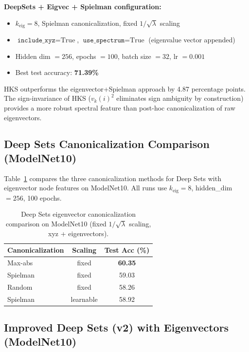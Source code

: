 \documentclass[11pt]{article}
\begin{document}
\noindent\textbf{DeepSets + Eigvec + Spielman configuration:}
\begin{itemize}[nosep]
    \item $k_{\text{eig}} = 8$, Spielman canonicalization, fixed $1/\sqrt{\lambda}$ scaling
    \item $\texttt{include\_xyz} = \text{True}$, $\texttt{use\_spectrum} = \text{True}$ (eigenvalue vector appended)
    \item Hidden dim $= 256$, epochs $= 100$, batch size $= 32$, lr $= 0.001$
    \item Best test accuracy: \textbf{71.39\%}
\end{itemize}

HKS outperforms the eigenvector+Spielman approach by 4.87 percentage points. The
sign-invariance of HKS ($v_k(i)^2$ eliminates sign ambiguity by construction) provides a
more robust spectral feature than post-hoc canonicalization of raw eigenvectors.

\subsection{Deep Sets Canonicalization Comparison (ModelNet10)}

Table~\ref{tab:deepsets_canon} compares the three canonicalization methods for Deep Sets
with eigenvector node features on ModelNet10. All runs use $k_{\text{eig}} = 8$,
hidden\_dim $= 256$, 100 epochs.

\begin{table}[ht]
\centering
\caption{Deep Sets eigenvector canonicalization comparison on ModelNet10 (fixed
$1/\sqrt{\lambda}$ scaling, xyz + eigenvectors).}
\label{tab:deepsets_canon}
\begin{tabular}{lcc}
\toprule
\textbf{Canonicalization} & \textbf{Scaling} & \textbf{Test Acc (\%)} \\
\midrule
Max-abs & fixed & \textbf{60.35} \\
Spielman & fixed & 59.03 \\
Random & fixed & 58.26 \\
Spielman & learnable & 58.92 \\
\bottomrule
\end{tabular}
\end{table}

\subsection{Improved Deep Sets (v2) with Eigenvectors (ModelNet10)}
\end{document}
